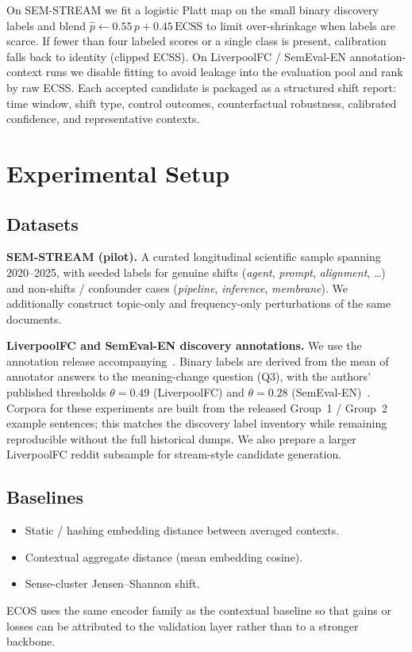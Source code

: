 \documentclass{llncs}
\newcommand{\addrev}[1]{{\color{blue}#1}}
\begin{document}
\addrev{On SEM-STREAM we fit a logistic Platt map on the small binary discovery labels and blend $\hat{p}\leftarrow 0.55\,p+0.45\,\mathrm{ECSS}$ to limit over-shrinkage when labels are scarce.
If fewer than four labeled scores or a single class is present, calibration falls back to identity (clipped ECSS).
On LiverpoolFC / SemEval-EN annotation-context runs we disable fitting to avoid leakage into the evaluation pool and rank by raw ECSS.}
Each accepted candidate is packaged as a structured shift report: time window, shift type, control outcomes, counterfactual robustness, calibrated confidence, and representative contexts.

\section{Experimental Setup}
\label{sec:setup}

\subsection{Datasets}
\textbf{SEM-STREAM (pilot).}
A curated longitudinal scientific sample spanning 2020--2025, with seeded labels for genuine shifts (\textit{agent}, \textit{prompt}, \textit{alignment}, \ldots) and non-shifts / confounder cases (\textit{pipeline}, \textit{inference}, \textit{membrane}).
We additionally construct topic-only and frequency-only perturbations of the same documents.

\textbf{LiverpoolFC and SemEval-EN discovery annotations.}
We use the annotation release accompanying~\cite{umarova2025discovery}.
Binary labels are derived from the mean of annotator answers to the meaning-change question (Q3), with the authors' published thresholds $\theta=0.49$ (LiverpoolFC) and $\theta=0.28$ (SemEval-EN)~\cite{kurup2025truth}.
Corpora for these experiments are built from the released Group~1 / Group~2 example sentences; this matches the discovery label inventory while remaining reproducible without the full historical dumps.
We also prepare a larger LiverpoolFC reddit subsample for stream-style candidate generation.

\subsection{Baselines}
\begin{itemize}
\item Static / hashing embedding distance between averaged contexts.
\item Contextual aggregate distance (mean embedding cosine).
\item Sense-cluster Jensen--Shannon shift.
\end{itemize}
ECOS uses the same encoder family as the contextual baseline so that gains or losses can be attributed to the validation layer rather than to a stronger backbone.
\end{document}
